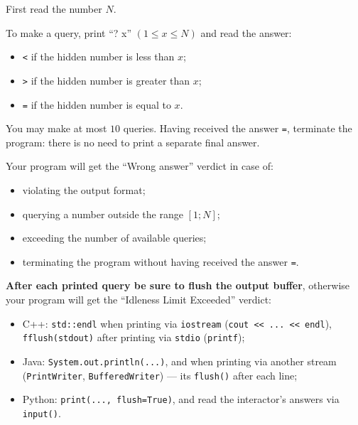 First read the number $N$.

To make a query, print ``? x'' $(1 \le x \le N)$ and read the answer:

\begin{itemize}
\item \texttt{<} if the hidden number is less than $x$;
\item \texttt{>} if the hidden number is greater than $x$;
\item \texttt{=} if the hidden number is equal to $x$.
\end{itemize}

You may make at most $10$ queries. Having received the answer \texttt{=}, terminate the program: there is no need to print a separate final answer.

Your program will get the ``Wrong answer'' verdict in case of:

\begin{itemize}
\item violating the output format;
\item querying a number outside the range $[1; N]$;
\item exceeding the number of available queries;
\item terminating the program without having received the answer \texttt{=}.
\end{itemize}

\textbf{After each printed query be sure to flush the output buffer}, otherwise your program will get the ``Idleness Limit Exceeded'' verdict:

\begin{itemize}
\item C++: \texttt{std::endl} when printing via \texttt{iostream} (\texttt{cout << ... << endl}), \texttt{fflush(stdout)} after printing via \texttt{stdio} (\texttt{printf});
\item Java: \texttt{System.out.println(...)}, and when printing via another stream (\texttt{PrintWriter}, \texttt{BufferedWriter}) --- its \texttt{flush()} after each line;
\item Python: \texttt{print(..., flush=True)}, and read the interactor's answers via \texttt{input()}.
\end{itemize}
